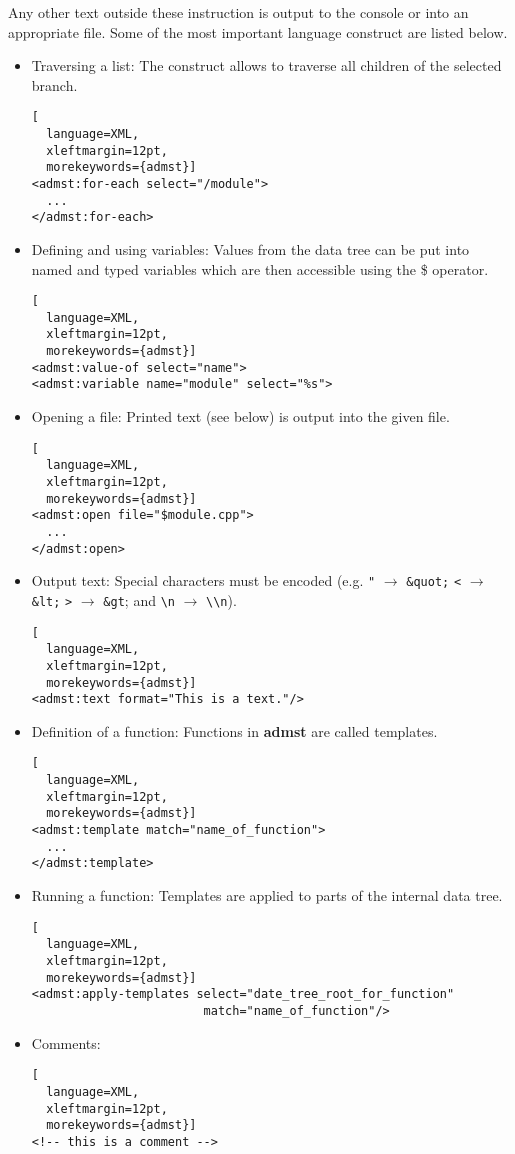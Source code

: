 Any other text outside these instruction is output to the console or
into an appropriate file.  Some of the most important language
construct are listed below.

\begin{itemize}

\item
Traversing a list: The construct allows to traverse all children of
the selected branch.
\begin{lstlisting}[
  language=XML,
  xleftmargin=12pt,
  morekeywords={admst}]
<admst:for-each select="/module">
  ...
</admst:for-each>
\end{lstlisting}

\item
Defining and using variables: Values from the data tree can be put
into named and typed variables which are then accessible using the \$
operator.
\begin{lstlisting}[
  language=XML,
  xleftmargin=12pt,
  morekeywords={admst}]
<admst:value-of select="name">
<admst:variable name="module" select="%s">
\end{lstlisting}

\item
Opening a file: Printed text (see below) is output into the given
file.
\begin{lstlisting}[
  language=XML,
  xleftmargin=12pt,
  morekeywords={admst}]
<admst:open file="$module.cpp">
  ...
</admst:open>
\end{lstlisting}

\item
Output text: Special characters must be encoded (e.g. \verb+"+ $\rightarrow$
\verb+&quot;+ \verb+<+ $\rightarrow$ \verb+&lt;+ \verb+>+
$\rightarrow$ \verb+&gt+; and \verb+\n+ $\rightarrow$ \verb+\\n+).
\begin{lstlisting}[
  language=XML,
  xleftmargin=12pt,
  morekeywords={admst}]
<admst:text format="This is a text."/>
\end{lstlisting}

\item
Definition of a function:  Functions in \textbf{admst} are called templates.
\begin{lstlisting}[
  language=XML,
  xleftmargin=12pt,
  morekeywords={admst}]
<admst:template match="name_of_function">
  ...
</admst:template>
\end{lstlisting}

\item
Running a function: Templates are applied to parts of the internal
data tree.
\begin{lstlisting}[
  language=XML,
  xleftmargin=12pt,
  morekeywords={admst}]
<admst:apply-templates select="date_tree_root_for_function"
                        match="name_of_function"/>
\end{lstlisting}

\item Comments:
\begin{lstlisting}[
  language=XML,
  xleftmargin=12pt,
  morekeywords={admst}]
<!-- this is a comment -->
\end{lstlisting}

\end{itemize}


